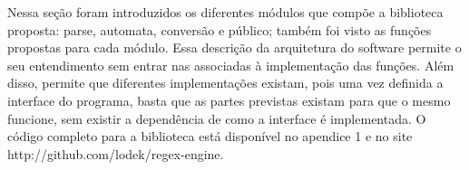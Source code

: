 Nessa seção foram introduzidos os diferentes módulos que compõe a biblioteca proposta: parse, automata, conversão e público; também foi visto as funções propostas para cada módulo.
Essa descrição da arquitetura do software permite o seu entendimento sem entrar nas  associadas à implementação das funções.
Além disso, permite que diferentes implementações existam, pois uma vez definida a interface do programa, basta que as partes previstas existam para que o mesmo funcione, sem existir a dependência de como a interface é implementada.
O código completo para a biblioteca está disponível no apendice 1 e no site http://github.com/lodek/regex-engine.


